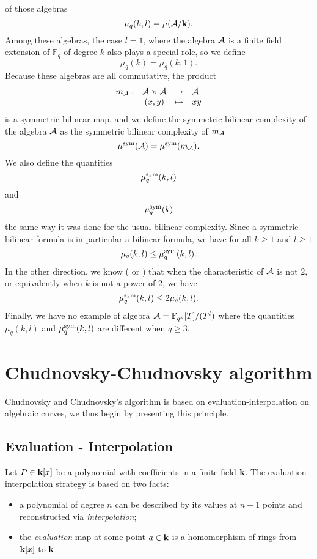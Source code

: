 of those algebras
\[
  \mu_q(k, l) = \mu(\mathcal{A}/\mathbf{k}).
\]
Among these algebras, the case $l=1$, where the algebra $\mathcal{A}$ is a finite field
extension of $\mathbb{F}_q$ of degree $k$ also plays a special role, so we
define 
\[
  \mu_q(k) = \mu_q(k, 1).
\]
Because these algebras are all commutative, the product 
\[
\begin{array}{lccl}
  m_{\mathcal{A}}:&\mathcal{A}\times \mathcal{A}&\to&\mathcal{A}\\
  &(x, y)&\mapsto&xy
\end{array}
\]
is a symmetric bilinear map, and we define the symmetric bilinear complexity of
the algebra $\mathcal{A}$ as the symmetric bilinear complexity of $m_{\mathcal{A}}$
\[
  \mu^{\textrm{sym}}(\mathcal{A}) = \mu^{\textrm{sym}}(m_{\mathcal{A}}).
\]
We also define the quantities
\[
  \mu^{\textrm{sym}}_q(k, l)
\]
and 
\[
  \mu^{\textrm{sym}}_q(k)
\]
the same way it was done for the usual bilinear complexity. Since a symmetric
bilinear formula is in particular a bilinear formula, we have for all $k\geq1$
and $l\geq1$
\[
  \mu_q(k, l)\leq\mu^{\textrm{sym}}_q(k, l).
\]
In the other direction, we know (\cite[Theorem $1$]{SL84} or \cite[Lemma
$1.6$]{Randriam12}) that when the characteristic of $\mathcal{A}$ is not $2$,
or equivalently when $k$ is not a power of $2$, we have
\[
  \mu^{\textrm{sym}}_q(k, l)\leq2\mu_q(k, l).
\]
Finally, we have no example of algebra $\mathcal{A} = \mathbb{F}_{q^k}[T]/(T^l)$ where the
quantities $\mu_q(k, l)$ and $\mu^{\textrm{sym}}_q(k, l)$ are different when $q\geq3$.
%

\section{Chudnovsky-Chudnovsky algorithm}
\label{sec:chudchud-algo}

Chudnovsky and Chudnovsky's algorithm is based on evaluation-interpolation on
algebraic curves, we thus begin by presenting this principle.
\subsection{Evaluation - Interpolation}
\label{sec:evalinter}

Let $P\in\mathbf{k}[x]$ be a polynomial with coefficients in a finite field $\mathbf{k}$. The
evaluation-interpolation strategy is based on two facts:
\begin{itemize}
  \item a polynomial of degree $n$ can be described by its values at $n+1$
    points and reconstructed via \emph{interpolation};
  \item the \emph{evaluation} map at some point $a\in\mathbf{k}$ is a homomorphism of rings from
    $\mathbf{k}[x]$ to $\mathbf{k}$.
\end{itemize}
